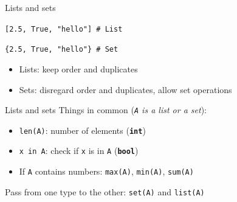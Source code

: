 \documentclass[11pt]{beamer}
\begin{document}
\begin{frame}{Lists and sets}

  \texttt{[2.5, True, "hello"] \qquad \# List}

  \texttt{\{2.5, True, "hello"\} \qquad \# Set}

  \vspace{0.3cm}
  \begin{itemize}
    \item Lists: keep order and duplicates
    \item Sets: disregard order and duplicates, allow set operations
  \end{itemize}
\end{frame}


\begin{frame}{Lists and sets}
  Things in common (\emph{\texttt{A} is a list or a set}):

  \vspace{0.3cm}
  \begin{itemize}
    \item \texttt{len(A)}: number of elements (\texttt{\bf int})
    \item \texttt{x in A}: check if \texttt{x} is in \texttt{A}
          (\texttt{\bf bool})
    \item If \texttt{A} contains numbers: \texttt{max(A)}, \texttt{min(A)},
          \texttt{sum(A)}
  \end{itemize}

  \vspace{0.3cm}
  Pass from one type to the other: \texttt{set(A)} and \texttt{list(A)}
\end{frame}
\end{document}
